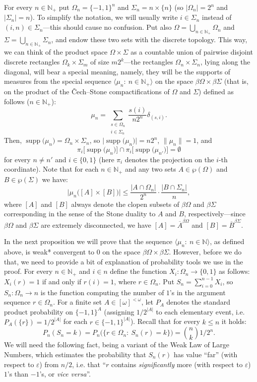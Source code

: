 \documentclass[11pt]{amsart}
\theoremstyle{definition}
\theoremstyle{remark}
\numberwithin{equation}{section}
\newcommand{\eps}{\varepsilon}
\newcommand{\N}{\mathbb{N}}
\newcommand{\ol}{\overline}
\DeclareMathOperator{\supp}{supp}
\newcommand{\seq}[2]{\big\langle#1\colon\ #2\big\rangle}
\newcommand{\seqn}[1]{\big\langle#1\colon\ n\io\big\rangle}
\newcommand{\finsub}[1]{\left[#1\right]^{<\omega}}
\newcommand{\io}{\in\mathbb{N}}%
\newcommand{\fso}{\finsub{\omega}}%
\begin{document}
For every $n\io_+$
put $\Omega_n=\{-1,1\}^n$ and $\Sigma_n=n\times\{n\}$ (so
$\big|\Omega_n\big|=2^n$ and $\big|\Sigma_n\big|=n$). To simplify
the notation, we will usually write $i\in\Sigma_n$ instead of
$(i,n)\in\Sigma_n$---this should cause no confusion. Put also
$\Omega=\bigcup_{n\io_+}\Omega_n$ and
$\Sigma=\bigcup_{n\io_+}\Sigma_n$, and endow these two sets with the
discrete topology. This way, we can think of the product space
$\Omega\times\Sigma$ as a countable union of pairwise disjoint
discrete rectangles $\Omega_k\times\Sigma_m$ of size $m2^k$---the
rectangles $\Omega_n\times\Sigma_n$, lying along the diagonal, will
bear a special meaning, namely, they will be the supports of
measures from the special sequence $\seq{\mu_n}{n\io_+}$ on the space
$\beta\Omega\times\beta\Sigma$ (that is, on the product of the \v{C}ech--Stone compactifications of $\Omega$ and $\Sigma$) defined as follows ($n\io_+$):
\[\mu_n=\sum_{\substack{s\in\Omega_n\\i\in\Sigma_n}}\frac{s(i)}{n2^n}\delta_{(s,i)}.\]
Then, $\supp\big(\mu_n\big)=\Omega_n\times\Sigma_n$, so $\big|\supp\big(\mu_n\big)\big|=n2^n$,
$\big\|\mu_n\big\|=1$, and
\[\pi_i\big[\supp\big(\mu_n\big)\big]\cap\pi_i\big[\supp\big(\mu_{n'}\big)\big]=\emptyset\]
for every $n\neq n'$ and $i\in\{0,1\}$ (here $\pi_i$ denotes the projection on the $i$-th coordinate). Note that for each $n\io_+$ and any two sets $A\in\wp(\Omega)$ and $B\in\wp(\Sigma)$ we have:
\[\tag{$\dagger$}\big|\mu_n\big([A]\times[B]\big)\big|\le\frac{\big|A\cap \Omega_n\big|}{2^n}\cdot\frac{\big|B\cap \Sigma_n\big|}{n},\]
where $[A]$ and $[B]$ always denote the clopen subsets of $\beta\Omega$ and $\beta\Sigma$ corresponding in the sense of the Stone duality to $A$ and $B$, respectively---since $\beta\Omega$ and $\beta\Sigma$ are extremely disconnected, we have $[A]=\ol{A}^{\beta\Omega}$ and $[B]=\ol{B}^{\beta\Sigma}$.

\medskip

In the next proposition we will prove that the sequence $\seqn{\mu_n}$, as defined above, is weak* convergent to $0$ on the space $\beta\Omega\times\beta\Sigma$. However, before we do that, we need to provide a bit of explanation of probability tools we use in the proof. For every $n\io_+$ and $i\in n$ define the function $X_i\colon\Omega_n\to\{0,1\}$ as follows: $X_i(r)=1$ if and only if $r(i)=1$, where $r\in\Omega_n$. Put $S_n=\sum_{i=0}^{n-1}X_i$, so $S_n\colon\Omega_n\to n$ is the function computing the number of $1$'s in the argument sequence $r\in\Omega_n$. For a finite set $A\in\fso$, let $P_A$ denotes the standard product probability on $\{-1,1\}^A$ (assigning $1/2^{|A|}$ to each elementary event, i.e. $P_A(\{r\})=1/2^{|A|}$ for each $r\in\{-1,1\}^{|A|}$). Recall that for every $k\le n$ it holds:
\[P_n(S_n=k)=P_n\big(\big\{r\in\Omega_n\colon\ S_n(r)=k\big\}\big)={n\choose k}1/2^n.\]
We will need the following fact, being a variant of the Weak Law of Large Numbers, which estimates the probability that $S_n(r)$ has value ``far'' (with respect to $\eps$) from $n/2$, i.e. that ``$r$ contains \emph{significantly} more (with respect to $\eps$) $1$'s than $-1$'s, or \textit{vice versa}''.
\end{document}
